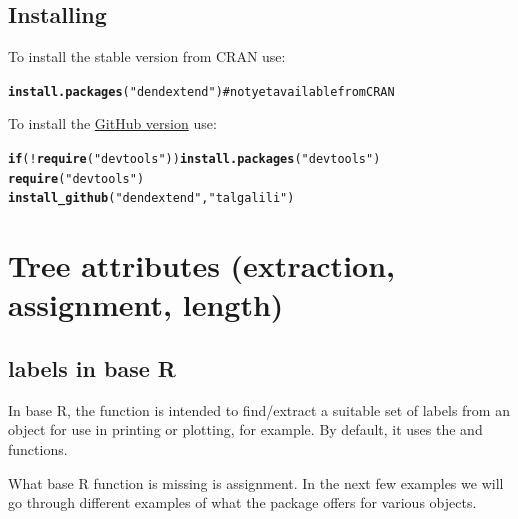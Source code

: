 \documentclass[shortnames,nojss,article]{jss}\usepackage{graphicx, color}
\makeatletter
\newcommand{\hlfunctioncall}[1]{\textcolor[rgb]{0.501960784313725,0,0.329411764705882}{\textbf{#1}}}%
\newcommand{\hlstring}[1]{\textcolor[rgb]{0.6,0.6,1}{#1}}%
\newenvironment{kframe}{%
 \def\at@end@of@kframe{}%
 \ifinner\ifhmode%
  \def\at@end@of@kframe{\end{minipage}}%
  \begin{minipage}{\columnwidth}%
 \fi\fi%
 \def\FrameCommand##1{\hskip\@totalleftmargin \hskip-\fboxsep
 \colorbox{shadecolor}{##1}\hskip-\fboxsep
     \hskip-\linewidth \hskip-\@totalleftmargin \hskip\columnwidth}%
 \MakeFramed {\advance\hsize-\width
   \@totalleftmargin\z@ \linewidth\hsize
   \@setminipage}}%
 {\par\unskip\endMakeFramed%
 \at@end@of@kframe}
\newenvironment{knitrout}{}{} %
\makeatother
\begin{document}
\subsection{Installing }

To install the stable version from CRAN use:

\begin{knitrout}
\color{fgcolor}\begin{kframe}
\begin{alltt}
\hlfunctioncall{install.packages}(\hlstring{"dendextend"})  # not yet available from CRAN
\end{alltt}
\end{kframe}
\end{knitrout}



To install the \href{https://github.com/talgalili/dendextend}{GitHub version} use:

\begin{knitrout}
\color{fgcolor}\begin{kframe}
\begin{alltt}
\hlfunctioncall{if} (!\hlfunctioncall{require}(\hlstring{"devtools"})) \hlfunctioncall{install.packages}(\hlstring{"devtools"})
\hlfunctioncall{require}(\hlstring{"devtools"})
\hlfunctioncall{install_github}(\hlstring{"dendextend"}, \hlstring{"talgalili"})
\end{alltt}
\end{kframe}
\end{knitrout}



\section{Tree attributes (extraction, assignment, length)}


\subsection{labels in base R}

In base R, the  function is intended to find/extract a suitable set of labels from an object for use in printing or plotting, for example. By default, it uses the  and  functions.

What base R  function is missing is assignment. In the next few examples we will go through different examples of what the  package offers for various objects.
\end{document}
